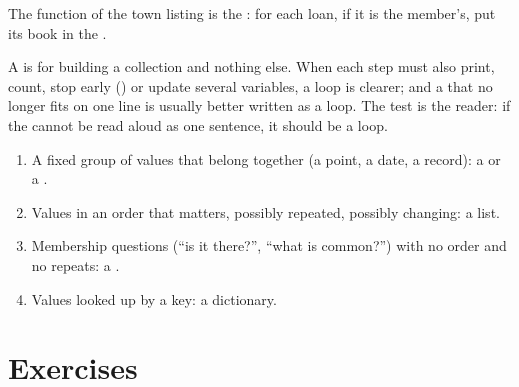 \begin{example}\label{ex:g10:tuples-sets-comprehensions:books-of}
The function  of the town listing is the  
: for each loan, if it is the member's,
put its book in the .
\end{example}

\begin{remark}\label{rem:g10:tuples-sets-comprehensions:loop-clearer}
A  is for building a collection and nothing else. When each step must also print, count, stop early
() or update several variables, a loop is clearer; and a  that no longer fits on one line
is usually better written as a loop. The test is the reader: if the  cannot be read aloud as one
sentence, it should be a loop.
\end{remark}

\begin{method}\label{met:g10:tuples-sets-comprehensions:choose}
\begin{enumerate}
  \item A fixed group of values that belong together (a point, a date, a record): a  or a .
  \item Values in an order that matters, possibly repeated, possibly changing: a list.
  \item Membership questions (``is it there?'', ``what is common?'') with no order and no repeats: a .
  \item Values looked up by a key: a dictionary.
\end{enumerate}
\end{method}

\section{Exercises}\label{sec:g10:tuples-sets-comprehensions:exercises}

